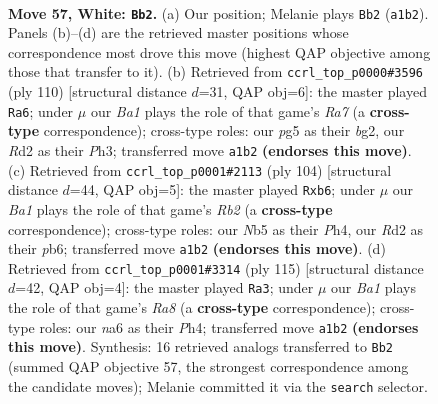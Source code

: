 \documentclass[11pt]{article}
\begin{document}
\clearpage

\begin{figure}[p]\centering
\begin{subfigure}{0.46\textwidth}\centering
\resizebox{\linewidth}{!}{%
\newchessgame
\chessboard[
  setfen={6k1/4p3/npr4p/pN4p1/P1p5/2P2PK1/3R4/B7 w - - 2 57},
  showmover=false,
  pgfstyle=straightmove, color=movearrow, markmove={a1-b2}
]}
\caption{}
\end{subfigure}\hfill
\begin{subfigure}{0.46\textwidth}\centering
\resizebox{\linewidth}{!}{%
\newchessgame
\chessboard[
  setfen={6k1/R7/1p3r1p/4N1p1/P2P1p2/7P/4KPb1/8 w - - 4 56},
  showmover=false,
  pgfstyle=straightmove, color=movearrow, markmove={a7-a6}
]}
\caption{}
\end{subfigure}
\\[4pt]
\begin{subfigure}{0.46\textwidth}\centering
\resizebox{\linewidth}{!}{%
\newchessgame
\chessboard[
  setfen={8/4kp2/1p4p1/2pr3p/7P/5PP1/1RP1K3/8 w - - 0 53},
  showmover=false,
  pgfstyle=straightmove, color=movearrow, markmove={b2-b6}
]}
\caption{}
\end{subfigure}\hfill
\begin{subfigure}{0.46\textwidth}\centering
\resizebox{\linewidth}{!}{%
\newchessgame
\chessboard[
  setfen={8/5p2/4p2k/4P1p1/P1R3Pp/5P1P/4K3/r7 b - - 33 58},
  showmover=false,
  pgfstyle=straightmove, color=movearrow, markmove={a1-a3}
]}
\caption{}
\end{subfigure}
\caption{\textbf{Move 57, White: \texttt{Bb2}.} (a) Our position; Melanie plays \texttt{Bb2} (\texttt{a1b2}). Panels (b)--(d) are the retrieved master positions whose correspondence most drove this move (highest QAP objective among those that transfer to it). (b) Retrieved from \texttt{ccrl\_top\_p0000\#3596} (ply 110) [structural distance $d$=31, QAP obj=6]: the master played \texttt{Ra6}; under $\mu$ our \emph{Ba1} plays the role of that game's \emph{Ra7} (a \textbf{cross-type} correspondence); cross-type roles: our \emph{p}g5 as their \emph{b}g2, our \emph{R}d2 as their \emph{P}h3; transferred move \texttt{a1b2} \textbf{(endorses this move)}. (c) Retrieved from \texttt{ccrl\_top\_p0001\#2113} (ply 104) [structural distance $d$=44, QAP obj=5]: the master played \texttt{Rxb6}; under $\mu$ our \emph{Ba1} plays the role of that game's \emph{Rb2} (a \textbf{cross-type} correspondence); cross-type roles: our \emph{N}b5 as their \emph{P}h4, our \emph{R}d2 as their \emph{p}b6; transferred move \texttt{a1b2} \textbf{(endorses this move)}. (d) Retrieved from \texttt{ccrl\_top\_p0001\#3314} (ply 115) [structural distance $d$=42, QAP obj=4]: the master played \texttt{Ra3}; under $\mu$ our \emph{Ba1} plays the role of that game's \emph{Ra8} (a \textbf{cross-type} correspondence); cross-type roles: our \emph{n}a6 as their \emph{P}h4; transferred move \texttt{a1b2} \textbf{(endorses this move)}. Synthesis: 16 retrieved analogs transferred to \texttt{Bb2} (summed QAP objective 57, the strongest correspondence among the candidate moves); Melanie committed it via the \texttt{search} selector.}
\label{fig:thought-m112}
\end{figure}
\end{document}
